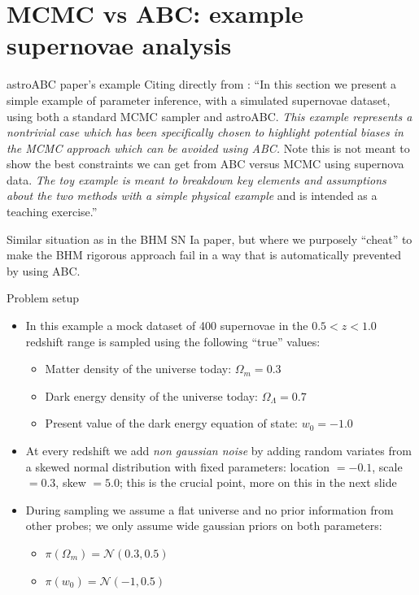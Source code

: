 \documentclass{beamer}
\theoremstyle{remark}
\newcommand{\N}{\mathcal{N}}
\begin{document}
\section{MCMC vs ABC: example supernovae analysis}
\begin{frame}{astroABC paper's example}
Citing directly from \cite{astroABC}: ``In this section we present a simple example of parameter inference, with a simulated supernovae dataset, using both a standard MCMC sampler and astroABC. \emph{This example represents a nontrivial case which has been specifically chosen to highlight potential biases in the MCMC approach which can be avoided using ABC.} Note this is not meant to show the best constraints we can get from ABC versus MCMC using supernova data. \emph{The toy example is meant to breakdown key elements and assumptions about the two methods with a simple physical example} and is intended as a teaching exercise.''


Similar situation as in the BHM SN Ia paper, but where we purposely ``cheat'' to make the BHM rigorous approach fail in a way that is automatically prevented by using ABC.
\end{frame}

\begin{frame}{Problem setup}
\begin{itemize}[<+->]
    \item In this example a mock dataset of 400 supernovae in the $0.5 < z < 1.0$ redshift range is sampled using the following ``true'' values:
    \begin{itemize}
        \item Matter density of the universe today: $\Omega_m = 0.3$
        \item Dark energy density of the universe today: $\Omega_\Lambda = 0.7$
        \item Present value of the dark energy equation of state: $w_0 = -1.0$
    \end{itemize}
    \item At every redshift we add \emph{non gaussian noise} by adding random variates from a skewed normal distribution with fixed parameters: location $= -0.1$, scale $= 0.3$, skew $= 5.0$; this is the crucial point, more on this in the next slide
    \item During sampling we assume a flat universe and no prior information from other probes; we only assume wide gaussian priors on both parameters:
    \begin{itemize}
        \item $\pi(\Omega_m) = \N(0.3, 0.5)$
        \item $\pi(w_0) = \N(-1, 0.5)$
    \end{itemize}
\end{itemize}
\end{frame}
\end{document}
